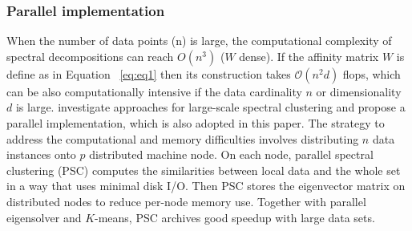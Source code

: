 \documentclass[12pt,letterpaper]{article}
\begin{document}
\subsubsection{Parallel implementation}
When the number of data points (n) is large, the computational complexity of spectral decompositions can reach $O(n^3)$ ($W$ dense). If the affinity matrix $W$ is define as in Equation ~\ref{eq:eq1} then its construction takes $\mathcal{O}(n^2d)$ flops, which 
can be also computationally intensive if the data cardinality $n$ or dimensionality $d$ is large.
\cite{Chen2011} investigate approaches for large-scale spectral clustering and propose a parallel implementation, which is also
adopted in this paper. The strategy to address the computational and memory difficulties involves distributing $n$ data instances 
onto $p$ distributed machine node. On each node, parallel spectral clustering (PSC) computes the similarities between local data and the whole set in a way that uses minimal disk I/O. Then PSC stores the eigenvector matrix on distributed nodes to reduce 
per-node memory use. Together with parallel eigensolver and $K$-means, PSC archives good speedup with large data sets.
\end{document}
